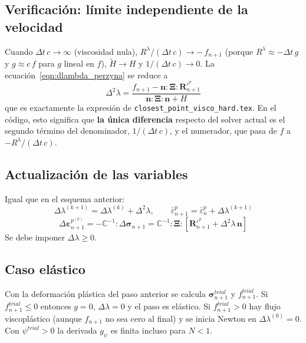 \documentclass[12pt]{article}
\begin{document}
\subsection*{Verificaci\'on: l\'imite independiente de la velocidad}
Cuando $\Delta t\,c \to \infty$ (viscosidad nula), $R^\lambda/(\Delta t\,c) \to -\,f_{n+1}$ (porque $R^\lambda \approx -\Delta t\,g$ y $g \approx c\,f$ para $g$ lineal en $f$), $\tilde H \to H$ y $1/(\Delta t\,c) \to 0$. La ecuaci\'on~\eqref{eqn:dlambda_perzyna} se reduce a
\[
    \Delta^2\lambda = \frac{f_{n+1} - \pmb{n}:\pmb{\Xi}:\pmb{R}^{\varepsilon^p}_{n+1}}{\pmb{n}:\pmb{\Xi}:\pmb{n} + H}
\]
que es exactamente la expresi\'on de \texttt{closest\_point\_visco\_hard.tex}. En el c\'odigo, esto significa que \textbf{la \'unica diferencia} respecto del solver actual es el segundo t\'ermino del denominador, $1/(\Delta t\,c)$, y el numerador, que pasa de $f$ a $-R^\lambda/(\Delta t\,c)$.

\subsection*{Actualizaci\'on de las variables}
Igual que en el esquema anterior:
\[ \Delta\lambda^{(k+1)} = \Delta\lambda^{(k)} + \Delta^2\lambda, \qquad \bar\varepsilon^{p}_{n+1} = \bar\varepsilon^p_n + \Delta\lambda^{(k+1)} \]
\[ \Delta\pmb{\varepsilon}^{p^{(k)}}_{n+1} = -\mathbb{C}^{-1}:\Delta\pmb{\sigma}_{n+1} = \mathbb{C}^{-1}:\pmb{\Xi}:\left[\pmb{R}^{\varepsilon^p}_{n+1} + \Delta^2\lambda\,\pmb{n}\right] \]
Se debe imponer $\Delta\lambda \geq 0$.

\subsection*{Caso el\'astico}
Con la deformaci\'on plástica del paso anterior se calcula $\pmb{\sigma}^{trial}_{n+1}$ y $f^{trial}_{n+1}$. Si $f^{trial}_{n+1} \leq 0$ entonces $g=0$, $\Delta\lambda=0$ y el paso es el\'astico. Si $f^{trial}_{n+1} > 0$ hay flujo viscoplástico (aunque $f_{n+1}$ no sea cero al final) y se inicia Newton en $\Delta\lambda^{(0)} = 0$. Con $\psi^{trial} > 0$ la derivada $g_\psi$ es finita incluso para $N<1$.
\end{document}
